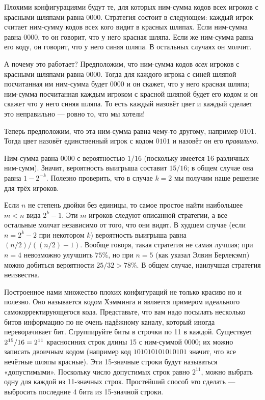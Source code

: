 Плохими конфигурациями будут те, для которых ним-сумма кодов всех игроков с красными шляпами равна $0000$.
Стратегия состоит в следующем:
каждый игрок считает ним-сумму кодов всех кого видит в красных шляпах.
Если ним-сумма равна $0000$, то он говорит, что у него красная шляпа.
Если же ним-сумма равна его коду, он говорит, что у него синяя шляпа.
В остальных случаях он молчит.

А почему это работает?
Предположим, что ним-сумма кодов \emph{всех} игроков с красными шляпами равна $0000$.
Тогда для каждого игрока с синей шляпой посчитанная им ним-сумма будет $0000$ и он скажет, что у него красная шляпа;
ним-сумма посчитанная каждым игроком с красной шляпой будет его кодом и он скажет что у него синяя шляпа.
То есть каждый назовёт цвет и каждый сделает это неправильно --- ровно то, что мы хотели!

Теперь  предположим, что эта ним-сумма равна чему-то другому, например $0101$.
Тогда цвет назовёт единственный игрок с кодом  $0101$ и назовёт он его \emph{правильно}.

Ним-сумма равна $0000$ с вероятностью $1/16$ (поскольку имеется 16 различных ним-сумм).
Значит, вероятность выигрыша составит $15/16$;
в общем случае она равна $1-2^{-k}$.
Полезно проверить, что в случае $k=2$ мы получим наше решение для трёх игроков.

Если $n$ не степень двойки без единицы, то самое простое найти наибольшее $m<n$ вида $2^k-1$.
Эти $m$ игроков следуют описанной стратегии, а все остальные молчат независимо от того, что они видят.
В худшем случае (если $n=2^k-2$ при некотором $k$) вероятность выигрыша равна $(n/2)/((n/2)-1)$.
Вообще говоря, такая стратегия не самая лучшая;
при $n=4$ невозможно улучшить $75\%$, но при $n=5$ (как указал Элвин Берлекэмп) можно добиться вероятности $25/32>78\%$.
В общем случае, наилучшая стратегия неизвестна.
\heart

Построенное нами множество плохих конфигураций не только красиво но и полезно.
Оно называется кодом Хэмминга и является примером идеального самокорректирующегося кода.
Представьте, что вам надо посылать несколько битов информацию по не очень надёжному каналу, который иногда переворачивает бит.
Сгруппируйте биты в строчки по 11 в каждой.
Существует $2^{15}/16\z=2^{11}$ красносиних строк длины 15 с ним-суммой $0000$;
их можно записать двоичным кодом (например код $101010101010101$ значит, что все нечётные шляпы красные).
Эти 15-значные строки будут называться «допустимыми».
Поскольку число допустимых строк равно $2^{11}$, можно выбрать одну для каждой из 11-значных строк.
Простейший способ это сделать --- выбросить последние 4 бита из 15-значной строки.

